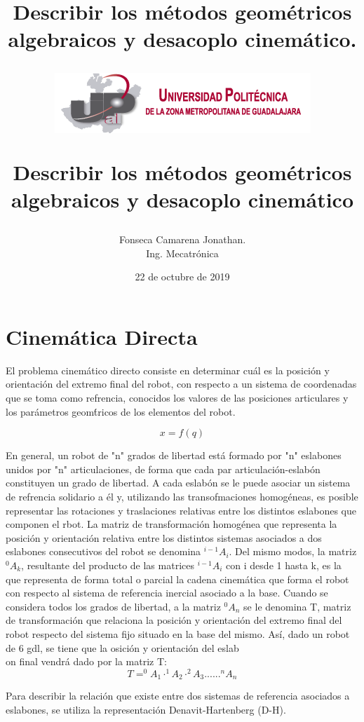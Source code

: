 \documentclass[letter,openright,12pt,spanish]{report}
\title{\textbf{Describir los métodos geométricos algebraicos y desacoplo cinemático.}}
\title{\begin{center}
\includegraphics[scale=1.5]{Escudo.png} 
\end{center}Describir los métodos geométricos algebraicos y desacoplo cinemático}
\author{Fonseca Camarena Jonathan.\\
		Ing. Mecatr\'onica}
\date{22 de octubre de 2019}
\begin{document}
\maketitle

\section{Cinem\'atica Directa}

El problema cinem\'atico directo consiste en determinar cu\'al es la posici\'on y orientaci\'on del extremo final del robot, con respecto a un sistema de coordenadas que se toma como refrencia, conocidos los valores de las posiciones articulares y los par\'ametros geom\'tricos de los elementos del robot. 

\begin{displaymath}
x=\textit{f}(q)
\end{displaymath}

En general, un robot de "n" grados de libertad est\'a formado por "n" eslabones unidos por "n" articulaciones, de forma que cada par articulaci\'on-eslab\'on constituyen un grado de libertad. A cada eslab\'on se le puede asociar un sistema de refrencia solidario a \'el y, utilizando las transofmaciones homog\'eneas, es posible representar las rotaciones y traslaciones relativas entre los distintos eslabones que componen el rbot. La matriz de transformaci\'on homog\'enea que representa la posici\'on y orientaci\'on relativa entre los distintos sistemas asociados a dos eslabones consecutivos del robot se denomina $^{i-1}A_i$. Del mismo modos, la matriz $^0A_k$, resultante del producto de las matrices $^{i-1}A_i$ con i desde 1 hasta k, es la que representa de forma total o parcial la cadena cinem\'atica que forma el robot con respecto al sistema de referencia inercial asociado a la base. Cuando se considera todos los grados de libertad, a la matriz $^0A_n$ se le denomina T, matriz de transformaci\'on que relaciona la posici\'on y orientaci\'on del extremo final del robot respecto del sistema fijo situado en la base del mismo. As\'i, dado un robot de 6 gdl, se tiene que la osici\'on y orientaci\'on del eslab\\on final vendr\'a dado por la matriz T:\\

\begin{displaymath}
T=^0A_1 \cdot ^1A_2 \cdot ^2A_3... ... ^nA_n
\end{displaymath} 

Para describir la relaci\'on que existe entre dos sistemas de referencia asociados a eslabones, se utiliza la representaci\'on Denavit-Hartenberg (D-H). 
\end{document}
